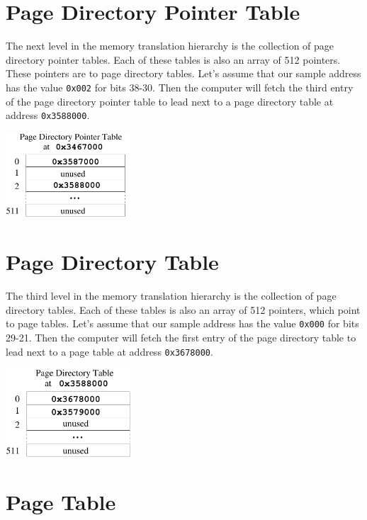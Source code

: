 \documentclass[11pt,b5paper]{book}
\begin{document}
\section{Page Directory Pointer Table}

The next level in the memory translation hierarchy is the collection
of page directory pointer tables.
Each of these tables is also an array of 512 pointers.
These pointers are to page directory tables.
Let's assume that our sample address has the value {\tt 0x002} for bits
38-30.
Then the computer will fetch the third entry of the page directory pointer
table to lead next to a page directory table at address {\tt 0x3588000}.

\begin{center}
\includegraphics[width=0.35\textwidth]{pdptable.pdf}
\end{center} 

\section{Page Directory Table}

The third level in the memory translation hierarchy is the collection
of page directory tables.
Each of these tables is also an array of 512 pointers,
which point to page tables.
Let's assume that our sample address has the value {\tt 0x000} for bits
29-21.
Then the computer will fetch the first entry of the page directory
table to lead next to a page table at address {\tt 0x3678000}.
 
\begin{center}
\includegraphics[width=0.35\textwidth]{pdtable.pdf}
\end{center}
\section{Page Table}
\end{document}
